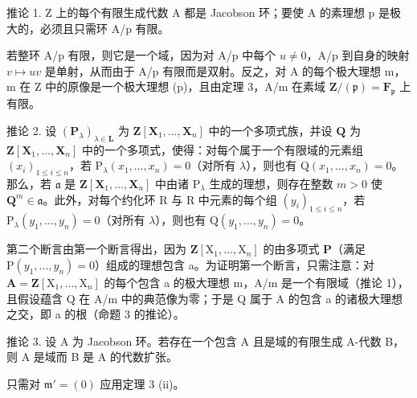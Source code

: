 推论 1. Z 上的每个有限生成代数 A 都是 Jacobson 环；要使 A 的素理想 p 是极大的，必须且只需环 A/p 有限。

若整环 A/p 有限，则它是一个域，因为对 A/p 中每个 \(u \neq 0\)，A/p 到自身的映射 \(v \mapsto uv\) 是单射，从而由于 A/p 有限而是双射。反之，对 A 的每个极大理想 m，m 在 Z 中的原像是一个极大理想 (p)，且由定理 3，A/m 在素域 \(\mathbf{Z}/(\mathfrak{p}) = \mathbf{F}_{\mathfrak{p}}\) 上有限。

推论 2. 设 \((\mathbf{P}_{\lambda})_{\lambda \in \mathbf{L}}\) 为 \(\mathbf{Z}[\mathbf{X}_1,\ldots ,\mathbf{X}_n]\) 中的一个多项式族，并设 \(\mathbf{Q}\) 为 \(\mathbf{Z}[\mathbf{X}_1,\dots ,\mathbf{X}_n]\) 中的一个多项式，使得：对每个属于一个有限域的元素组 \((x_i)_{1\leqslant i\leqslant n}\)，若 \(\mathrm{P}_{\lambda}(x_1,\ldots ,x_n) = 0\)（对所有 \(\lambda\)），则也有 \(\mathrm{Q}(x_1,\ldots ,x_n) = 0\)。那么，若 \(\mathfrak{a}\) 是 \(\mathbf{Z}[\mathbf{X}_1,\ldots ,\mathbf{X}_n]\) 中由诸 \(\mathrm{P}_{\lambda}\) 生成的理想，则存在整数 \(m > 0\) 使 \(\mathbf{Q}^m\in \mathfrak{a}\)。此外，对每个约化环 R 与 R 中元素的每个组 \((y_i)_{1\leqslant i\leqslant n}\)，若 \(\mathrm{P}_{\lambda}(y_1,\ldots ,y_n) = 0\)（对所有 \(\lambda\)），则也有 \(\mathrm{Q}(y_1,\ldots ,y_n) = 0\)。

第二个断言由第一个断言得出，因为 \(\mathbf{Z}[\mathrm{X}_1,\ldots ,\mathrm{X}_n]\) 的由多项式 \(\mathbf{P}\)（满足 \(\mathrm{P}(y_1,\dots,y_n) = 0\)）组成的理想包含 a。为证明第一个断言，只需注意：对 \(\mathbf{A} = \mathbf{Z}[\mathrm{X}_1,\dots,\mathrm{X}_n]\) 的每个包含 a 的极大理想 m，A/m 是一个有限域（推论 1），且假设蕴含 Q 在 A/m 中的典范像为零；于是 Q 属于 A 的包含 a 的诸极大理想之交，即 a 的根（命题 3 的推论）。

推论 3. 设 A 为 Jacobson 环。若存在一个包含 A 且是域的有限生成 A-代数 B，则 A 是域而 B 是 A 的代数扩张。

只需对 \(\mathfrak{m}' = (0)\) 应用定理 3 (ii)。


